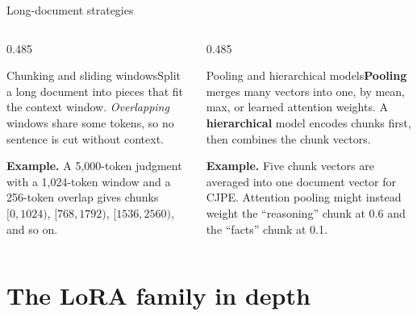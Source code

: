 \documentclass[aspectratio=169,11pt]{beamer}
\newcommand{\term}[3]{%
  \begin{block}{#1}\small #2\par\vspace{1mm}%
  {\color{exgreen}\textbf{Example.}} #3\end{block}}
\newcommand{\twoterms}[6]{%
  \begin{columns}[T]
    \begin{column}{0.485\textwidth}\term{#1}{#2}{#3}\end{column}
    \begin{column}{0.485\textwidth}\term{#4}{#5}{#6}\end{column}
  \end{columns}}
\begin{document}
\begin{frame}{Long-document strategies}
  \twoterms{Chunking and sliding windows}
  {Split a long document into pieces that fit the context window. \emph{Overlapping} windows share some tokens, so no sentence is cut without context.}
  {A 5,000-token judgment with a 1,024-token window and a 256-token overlap gives chunks $[0,1024)$, $[768,1792)$, $[1536,2560)$, and so on.}
  {Pooling and hierarchical models}
  {\textbf{Pooling} merges many vectors into one, by mean, max, or learned attention weights. A \textbf{hierarchical} model encodes chunks first, then combines the chunk vectors.}
  {Five chunk vectors are averaged into one document vector for CJPE. Attention pooling might instead weight the ``reasoning'' chunk at 0.6 and the ``facts'' chunk at 0.1.}
\end{frame}

\section{The LoRA family in depth}
\end{document}
